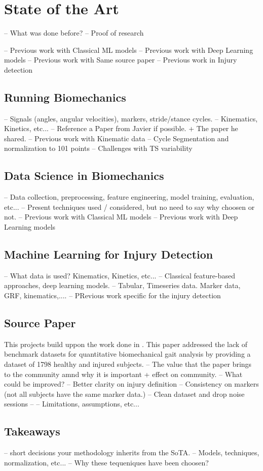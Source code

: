 \chapter{State of the Art}\label{chap:state-of-the-art}
-- What was done before?
-- Proof of research

-- Previous work with Classical ML models
-- Previous work with Deep Learning models
-- Previous work with Same source paper
-- Previous work in Injury detection

\section{Running Biomechanics}\label{sec:sota-biomechanics}
-- Signals (angles, angular velocities), markers, stride/stance cycles.
-- Kinematics, Kinetics, etc...
-- Reference a Paper from Javier if possible. + The paper he shared.
-- Previous work with Kinematic data
-- Cycle Segmentation and normalization to 101 points
    -- Challenges with TS variability

\section{Data Science in Biomechanics}\label{sec:sota-data-science}
-- Data collection, preprocessing, feature engineering, model training, evaluation, etc...
-- Present techniques used / considered, but no need to say why choosen or not.
-- Previous work with Classical ML models
-- Previous work with Deep Learning models

\section{Machine Learning for Injury Detection}\label{sec:sota-ml-injury-detection}
-- What data is used? Kinematics, Kinetics, etc...
-- Classical feature-based approaches, deep learning models.
-- Tabular, Timeseries data. Marker data, GRF, kinematics,....
-- PRevious work specific for the injury detection

\section{Source Paper}\label{sec:sota-source-paper}
This projects build uppon the work done in \citet{Ferber2024}. This paper addressed the lack of benchmark datasets for quantitative biomechanical gait analysis by providing a dataset of 1798 healthy and injured subjects.
-- The value that the paper brings to the community amnd why it is important + effect on community.
-- What could be improved?
-- Better clarity on injury definition
-- Consistency on markers (not all subjects have the same marker data.)
-- Clean dataset and drop noise sessions
-- 
-- Limitations, assumptions, etc...

\section{Takeaways}\label{sec:sota-methodological-takeaways}
-- short decisions your methodology inherits from the SoTA.
-- Models, techniques, normalization, etc...
-- Why these tequeniques have been choosen?
